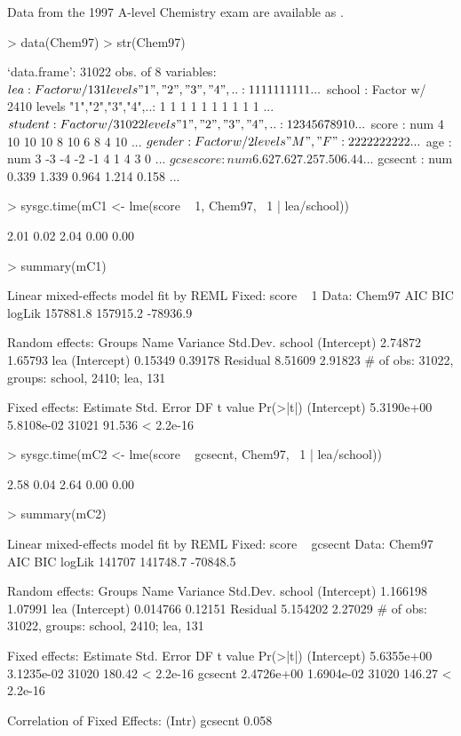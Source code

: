 \documentclass[12pt]{article}
\begin{document}
Data from the 1997 A-level Chemistry exam are available as .
\begin{Schunk}
\begin{Sinput}
> data(Chem97)
> str(Chem97)
\end{Sinput}
\begin{Soutput}
`data.frame':	31022 obs. of  8 variables:
 $ lea      : Factor w/ 131 levels "1","2","3","4",..: 1 1 1 1 1 1 1 1 1 1 ...
 $ school   : Factor w/ 2410 levels "1","2","3","4",..: 1 1 1 1 1 1 1 1 1 1 ...
 $ student  : Factor w/ 31022 levels "1","2","3","4",..: 1 2 3 4 5 6 7 8 9 10 ...
 $ score    : num  4 10 10 10 8 10 6 8 4 10 ...
 $ gender   : Factor w/ 2 levels "M","F": 2 2 2 2 2 2 2 2 2 2 ...
 $ age      : num  3 -3 -4 -2 -1 4 1 4 3 0 ...
 $ gcsescore: num  6.62 7.62 7.25 7.50 6.44 ...
 $ gcsecnt  : num  0.339 1.339 0.964 1.214 0.158 ...
\end{Soutput}
\begin{Sinput}
> sysgc.time(mC1 <- lme(score ~ 1, Chem97, ~1 | lea/school))
\end{Sinput}
\begin{Soutput}
[1] 2.01 0.02 2.04 0.00 0.00
\end{Soutput}
\begin{Sinput}
> summary(mC1)
\end{Sinput}
\begin{Soutput}
Linear mixed-effects model fit by REML
Fixed: score ~ 1 
 Data: Chem97 
      AIC      BIC   logLik
 157881.8 157915.2 -78936.9

Random effects:
 Groups   Name        Variance Std.Dev.
 school   (Intercept) 2.74872  1.65793 
 lea      (Intercept) 0.15349  0.39178 
 Residual             8.51609  2.91823 
# of obs: 31022, groups: school, 2410; lea, 131

Fixed effects:
              Estimate Std. Error    DF t value  Pr(>|t|)
(Intercept) 5.3190e+00 5.8108e-02 31021  91.536 < 2.2e-16
\end{Soutput}
\begin{Sinput}
> sysgc.time(mC2 <- lme(score ~ gcsecnt, Chem97, ~1 | lea/school))
\end{Sinput}
\begin{Soutput}
[1] 2.58 0.04 2.64 0.00 0.00
\end{Soutput}
\begin{Sinput}
> summary(mC2)
\end{Sinput}
\begin{Soutput}
Linear mixed-effects model fit by REML
Fixed: score ~ gcsecnt 
 Data: Chem97 
    AIC      BIC   logLik
 141707 141748.7 -70848.5

Random effects:
 Groups   Name        Variance Std.Dev.
 school   (Intercept) 1.166198 1.07991 
 lea      (Intercept) 0.014766 0.12151 
 Residual             5.154202 2.27029 
# of obs: 31022, groups: school, 2410; lea, 131

Fixed effects:
              Estimate Std. Error    DF t value  Pr(>|t|)
(Intercept) 5.6355e+00 3.1235e-02 31020  180.42 < 2.2e-16
gcsecnt     2.4726e+00 1.6904e-02 31020  146.27 < 2.2e-16

Correlation of Fixed Effects:
        (Intr)
gcsecnt 0.058 
\end{Soutput}
\end{Schunk}
\end{document}
